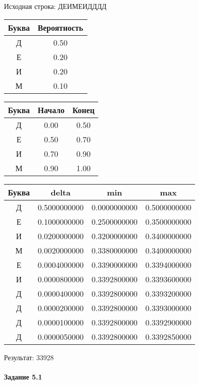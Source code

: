 \documentclass[a4paper, 12pt]{article}
\begin{document}
Исходная строка: ДЕИМЕИДДДД\
\begin{center}
 \begin{tabular}{ |c|c| } 
  \hline
     Буква & Вероятность \\ \hline
Д & 0.50\\\hline
Е & 0.20\\\hline
И & 0.20\\\hline
М & 0.10
\\ \hline \end{tabular}
\end{center}
\begin{center}
 \begin{tabular}{ |c|c|c| } 
  \hline
     Буква & Начало & Конец \\ \hline
Д & 0.00 & 0.50\\\hline
Е & 0.50 & 0.70\\\hline
И & 0.70 & 0.90\\\hline
М & 0.90 & 1.00
\\ \hline \end{tabular}
\end{center}
\begin{center}
 \begin{tabular}{ |c|c|c|c| } 
  \hline
     Буква & delta & min & max \\ \hline
Д & 0.5000000000 & 0.0000000000 & 0.5000000000\\\hline
Е & 0.1000000000 & 0.2500000000 & 0.3500000000\\\hline
И & 0.0200000000 & 0.3200000000 & 0.3400000000\\\hline
М & 0.0020000000 & 0.3380000000 & 0.3400000000\\\hline
Е & 0.0004000000 & 0.3390000000 & 0.3394000000\\\hline
И & 0.0000800000 & 0.3392800000 & 0.3393600000\\\hline
Д & 0.0000400000 & 0.3392800000 & 0.3393200000\\\hline
Д & 0.0000200000 & 0.3392800000 & 0.3393000000\\\hline
Д & 0.0000100000 & 0.3392800000 & 0.3392900000\\\hline
Д & 0.0000050000 & 0.3392800000 & 0.3392850000
\\ \hline \end{tabular}
\end{center}
Результат: 33928
\pagebreak
\paragraph{Задание 5.1}
\end{document}
